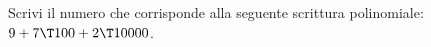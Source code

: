 \item Scrivi il numero che corrisponde alla seguente scrittura polinomiale: $9 + 7\T100 + 2\T10000$. 